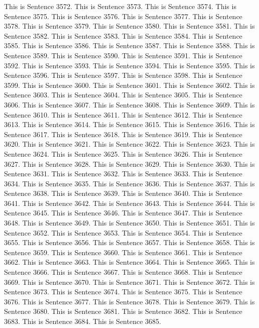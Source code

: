 \documentclass{article}
\begin{document}
This is Sentence 3572.
This is Sentence 3573.
This is Sentence 3574.
This is Sentence 3575.
This is Sentence 3576.
This is Sentence 3577.
This is Sentence 3578.
This is Sentence 3579.
This is Sentence 3580.
This is Sentence 3581.
This is Sentence 3582.
This is Sentence 3583.
This is Sentence 3584.
This is Sentence 3585.
This is Sentence 3586.
This is Sentence 3587.
This is Sentence 3588.
This is Sentence 3589.
This is Sentence 3590.
This is Sentence 3591.
This is Sentence 3592.
This is Sentence 3593.
This is Sentence 3594.
This is Sentence 3595.
This is Sentence 3596.
This is Sentence 3597.
This is Sentence 3598.
This is Sentence 3599.
This is Sentence 3600.
This is Sentence 3601.
This is Sentence 3602.
This is Sentence 3603.
This is Sentence 3604.
This is Sentence 3605.
This is Sentence 3606.
This is Sentence 3607.
This is Sentence 3608.
This is Sentence 3609.
This is Sentence 3610.
This is Sentence 3611.
This is Sentence 3612.
This is Sentence 3613.
This is Sentence 3614.
This is Sentence 3615.
This is Sentence 3616.
This is Sentence 3617.
This is Sentence 3618.
This is Sentence 3619.
This is Sentence 3620.
This is Sentence 3621.
This is Sentence 3622.
This is Sentence 3623.
This is Sentence 3624.
This is Sentence 3625.
This is Sentence 3626.
This is Sentence 3627.
This is Sentence 3628.
This is Sentence 3629.
This is Sentence 3630.
This is Sentence 3631.
This is Sentence 3632.
This is Sentence 3633.
This is Sentence 3634.
This is Sentence 3635.
This is Sentence 3636.
This is Sentence 3637.
This is Sentence 3638.
This is Sentence 3639.
This is Sentence 3640.
This is Sentence 3641.
This is Sentence 3642.
This is Sentence 3643.
This is Sentence 3644.
This is Sentence 3645.
This is Sentence 3646.
This is Sentence 3647.
This is Sentence 3648.
This is Sentence 3649.
This is Sentence 3650.
This is Sentence 3651.
This is Sentence 3652.
This is Sentence 3653.
This is Sentence 3654.
This is Sentence 3655.
This is Sentence 3656.
This is Sentence 3657.
This is Sentence 3658.
This is Sentence 3659.
This is Sentence 3660.
This is Sentence 3661.
This is Sentence 3662.
This is Sentence 3663.
This is Sentence 3664.
This is Sentence 3665.
This is Sentence 3666.
This is Sentence 3667.
This is Sentence 3668.
This is Sentence 3669.
This is Sentence 3670.
This is Sentence 3671.
This is Sentence 3672.
This is Sentence 3673.
This is Sentence 3674.
This is Sentence 3675.
This is Sentence 3676.
This is Sentence 3677.
This is Sentence 3678.
This is Sentence 3679.
This is Sentence 3680.
This is Sentence 3681.
This is Sentence 3682.
This is Sentence 3683.
This is Sentence 3684.
This is Sentence 3685.
\end{document}
